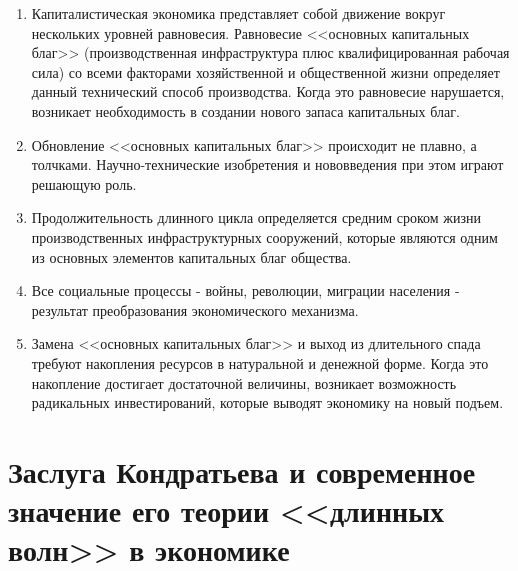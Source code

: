 \documentclass[a4paper,14pt]{extarticle}
\begin{document}
 	\begin{enumerate}
 		\item Капиталистическая экономика представляет собой движение вокруг нескольких уровней равновесия. Равновесие <<основных капитальных благ>> (производственная инфраструктура плюс квалифицированная рабочая сила) со всеми факторами хозяйственной и общественной жизни определяет данный технический способ производства. Когда это равновесие нарушается, возникает необходимость в создании нового запаса капитальных благ.
 		\item Обновление <<основных капитальных благ>> происходит не плавно, а толчками. Научно-технические изобретения и нововведения при этом играют решающую роль.
 		\item Продолжительность длинного цикла определяется средним сроком жизни производственных инфраструктурных сооружений, которые являются одним из основных элементов капитальных благ
 		общества.
 		\item Все социальные процессы - войны, революции, миграции населения - результат преобразования экономического механизма.
 		\item Замена <<основных капитальных благ>> и выход из длительного спада требуют накопления ресурсов в натуральной и денежной форме. Когда это накопление достигает достаточной величины, возникает возможность радикальных инвестирований, которые выводят экономику на новый подъем.
 	\end{enumerate}

 	\section{Заслуга Кондратьева и современное значение его теории <<длинных волн>> в экономике}
 	
\end{document}
